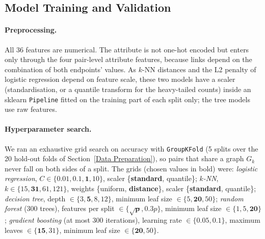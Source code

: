 \documentclass[runningheads]{llncs}
\begin{document}
\subsection{Model Training and Validation}
\label{Model Training and Validation}

\paragraph{Preprocessing.} All 36 features are numerical. The attribute is not one-hot encoded but enters only through the four pair-level attribute features, because links depend on the combination of both endpoints' values. As $k$-NN distances and the L2 penalty of logistic regression depend on feature scale, these two models have a scaler (standardisation, or a quantile transform for the heavy-tailed counts) inside an sklearn \texttt{Pipeline} fitted on the training part of each split only; the tree models use raw features.

\paragraph{Hyperparameter search.} We ran an exhaustive grid search on accuracy with \texttt{GroupKFold} (5 splits over the 20 hold-out folds of Section~\ref{Data Preparation}), so pairs that share a graph $G_k$ never fall on both sides of a split. The grids (chosen values in bold) were: \emph{logistic regression}, $C \in \{0.01, 0.1, \mathbf{1}, 10\}$, scaler \{\textbf{standard}, quantile\}; \emph{$k$-NN}, $k \in \{15, \mathbf{31}, 61, 121\}$, weights \{uniform, \textbf{distance}\}, scaler \{\textbf{standard}, quantile\}; \emph{decision tree}, depth $\in \{3, \mathbf{5}, 8, 12\}$, minimum leaf size $\in \{5, \mathbf{20}, 50\}$; \emph{random forest} (300 trees), features per split $\in \{\mathbf{\sqrt{p}}, 0.3p\}$, minimum leaf size $\in \{1, 5, \mathbf{20}\}$; \emph{gradient boosting} (at most 300 iterations), learning rate $\in \{\mathbf{0.05}, 0.1\}$, maximum leaves $\in \{\mathbf{15}, 31\}$, minimum leaf size $\in \{\mathbf{20}, 50\}$.
\end{document}
